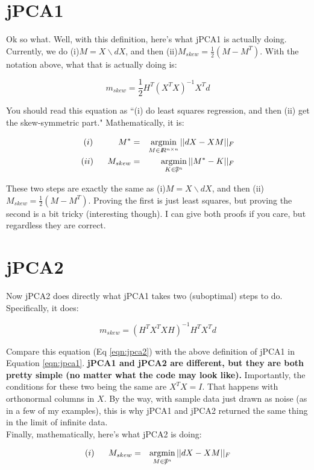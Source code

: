 \documentclass[11pt]{article}
\newcommand{\reals}{I\!\!R} %
\newcommand{\skewsym}{/\!\!\!\mathbb{S}}
\def\argmin{\qopname\relax n{argmin}}
\begin{document}
\section{jPCA1}

Ok so what.  Well, with this definition, here's what jPCA1 is actually doing.  Currently, we do (i)$M = X\backslash dX$, and then (ii)$M_{skew} = \frac{1}{2}(M - M^T)$.  With the notation above, what that is actually doing is:

\begin{equation}
\label{eqn:jpca1}
m_{skew} = \frac{1}{2}H^T(X^TX)^{-1}X^Td
\end{equation}

You should read this equation as ``(i) do least squares regression, and then (ii) get the skew-symmetric part."  Mathematically, it is:

\begin{eqnarray}
(i)~~~~~~~~~M^* & = & \argmin_{M \in \reals^{n \times n}} || dX - XM ||_F\\
(ii)~~~~~M_{skew} & = & \argmin_{K \in \skewsym^n} || M^* - K ||_F
\end{eqnarray}

These two steps are exactly the same as  (i)$M = X\backslash dX$, and then (ii)$M_{skew} = \frac{1}{2}(M - M^T)$.   Proving the first is just least squares, but proving the second is a bit tricky (interesting though).  I can give both proofs if you care, but regardless they are correct.


\section{jPCA2}

Now jPCA2 does directly what jPCA1 takes two (suboptimal) steps to do.   Specifically, it does:

\begin{equation}
\label{eqn:jpca2}
m_{skew} = (H^TX^TXH)^{-1}H^TX^Td
\end{equation}

Compare this equation (Eq \ref{eqn:jpca2}) with the above definition of jPCA1 in Equation \ref{eqn:jpca1}.  {\bf jPCA1 and jPCA2 are different, but they are both pretty simple (no matter what the code may look like). }  Importantly, the conditions for these two being the same are $X^TX = I$.  That happens with orthonormal columns in $X$.  By the way, with sample data just drawn as noise (as in a few of my examples), this is why jPCA1 and jPCA2 returned the same thing in the limit of infinite data.
\\

Finally, mathematically, here's what jPCA2 is doing:

\begin{eqnarray}
(i)~~~~~M_{skew} & = & \argmin_{M \in \skewsym^n} || dX - XM ||_F
\end{eqnarray}
\end{document}
